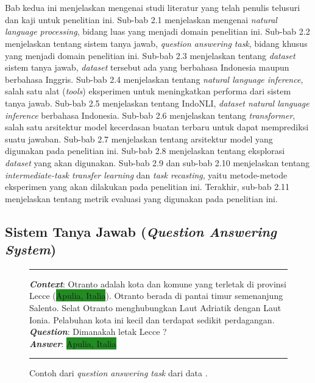 \chapter{\babDua}
\label{bab:2}
Bab kedua ini menjelaskan mengenai studi literatur yang telah penulis telusuri dan kaji untuk penelitian ini. Sub-bab 2.1 menjelaskan mengenai \emph{natural language processing}, bidang luas yang menjadi domain penelitian ini. Sub-bab 2.2 menjelaskan tentang sistem tanya jawab, \emph{question answering task}, bidang khusus yang menjadi domain penelitian ini. Sub-bab 2.3 menjelaskan tentang \emph{dataset} sistem tanya jawab, \emph{dataset} tersebut ada yang berbahasa Indonesia maupun berbahasa Inggris. Sub-bab 2.4 menjelaskan tentang \emph{natural language inference}, salah satu alat (\emph{tools}) eksperimen untuk meningkatkan performa dari sistem tanya jawab. Sub-bab 2.5 menjelaskan tentang IndoNLI, \emph{dataset natural language inference} berbahasa Indonesia. Sub-bab 2.6 menjelaskan tentang \emph{transformer}, salah satu arsitektur model kecerdasan buatan terbaru untuk dapat memprediksi suatu jawaban. Sub-bab 2.7 menjelaskan tentang arsitektur model yang digunakan pada penelitian ini. Sub-bab 2.8 menjelaskan tentang eksplorasi \emph{dataset} yang akan digunakan. Sub-bab 2.9 dan sub-bab 2.10 menjelaskan tentang \emph{intermediate-task transfer learning} dan \emph{task recasting}, yaitu metode-metode eksperimen yang akan dilakukan pada penelitian ini. Terakhir, sub-bab 2.11 menjelaskan tentang metrik evaluasi yang digunakan pada penelitian ini.

\section{Sistem Tanya Jawab (\emph{Question Answering System})}

\begin{figure}[h]
\vspace{3pt}
\hrule
\vspace{3pt}

\textbf{\emph{Context}}: Otranto adalah kota dan komune yang terletak di  \colorbox{BurntOrange}{provinsi Lecce} (\colorbox{ForestGreen}{Apulia, Italia}). Otranto berada di pantai timur semenanjung Salento. Selat Otranto menghubungkan Laut Adriatik dengan Laut Ionia. Pelabuhan kota ini kecil dan terdapat sedikit perdagangan.\\

\textbf{\emph{Question}}: \colorbox{BurntOrange}{Dimanakah letak Lecce ?}\\

\textbf{\emph{Answer}}:  \colorbox{ForestGreen}{Apulia, Italia}

\vspace{3pt}
\hrule
\vspace{3pt}
\centering
\caption{Contoh dari \emph{question answering task} dari data \citep{putri-oh-2022-idk}.}
\end{figure}

